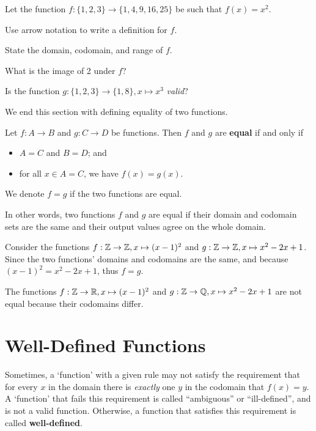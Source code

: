 \begin{exercise}
    Let the function $f: \{1, 2, 3\} \to \{1, 4, 9, 16, 25\}$ be such that $f(x) = x^2$.
    \begin{partquestions}{\roman*}
        \item Use arrow notation to write a definition for $f$.
        \item State the domain, codomain, and range of $f$.
        \item What is the image of 2 under $f$?
        \item Is the function $g: \{1, 2, 3\} \to \{1, 8\}, x \mapsto x^3$ \textit{valid}?
    \end{partquestions}
\end{exercise}

\newpage

We end this section with defining equality of two functions.
\begin{definition}
    Let $f: A \to B$ and $g: C \to D$ be functions. Then $f$ and $g$ are \textbf{equal} if and only if
    \begin{itemize}
        \item $A = C$ and $B = D$; and
        \item for all $x \in A = C$, we have $f(x) = g(x)$.
    \end{itemize}
    We denote $f = g$ if the two functions are equal.
\end{definition}
In other words, two functions $f$ and $g$ are equal if their domain and codomain sets are the same and their output values agree on the whole domain.
\begin{example}
    Consider the functions $f: \mathbb{Z} \to \mathbb{Z}, x \mapsto (x-1)^2$ and $g: \mathbb{Z} \to \mathbb{Z}, x \mapsto x^2 - 2x + 1$. Since the two functions' domains and codomains are the same, and because $(x-1)^2 = x^2 - 2x + 1$, thus $f = g$.
\end{example}
\begin{example}
    The functions $f: \mathbb{Z} \to \mathbb{R}, x \mapsto (x-1)^2$ and $g: \mathbb{Z} \to \mathbb{Q}, x \mapsto x^2 - 2x + 1$ are not equal because their codomains differ.
\end{example}

\section{Well-Defined Functions}
Sometimes, a `function' with a given rule may not satisfy the requirement that for every $x$ in the domain there is \textit{exactly} one $y$ in the codomain that $f(x) = y$. A `function' that fails this requirement is called ``ambiguous'' or ``ill-defined'', and is not a valid function. Otherwise, a function that satisfies this requirement is called \textbf{well-defined}.

